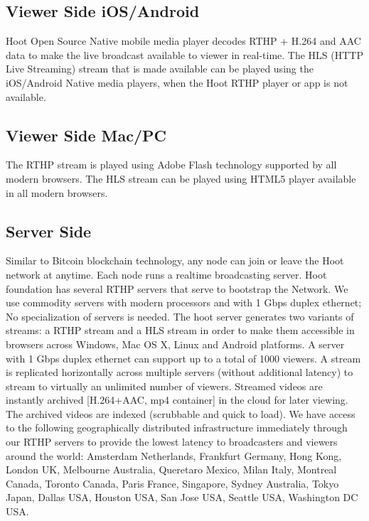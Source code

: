 \subsection{Viewer Side iOS/Android }
 Hoot Open Source Native mobile media player decodes RTHP + H.264 and AAC data to make the live broadcast available to viewer in real-time. The HLS (HTTP Live Streaming) stream that is made available can be played using the iOS/Android Native media players, when the Hoot RTHP player or app is not available.

\subsection{Viewer Side Mac/PC} 
The RTHP stream is played using Adobe Flash technology supported by all modern browsers. The HLS stream can be played using HTML5 player available in all modern browsers.

\subsection{Server Side}
Similar to Bitcoin blockchain technology, any node can join or leave the Hoot network at anytime. Each node runs a realtime broadcasting server.
Hoot foundation has several RTHP servers that serve to bootstrap the Network. We use commodity servers with modern processors and with 1 Gbps duplex ethernet;
No specialization of servers is needed. The hoot server generates two variants of streams: a RTHP stream and a HLS stream in order to make them accessible in browsers across Windows, Mac OS X, Linux and Android platforms. A server with 1 Gbps duplex ethernet can support up to a total of 1000 viewers. A stream is replicated horizontally across multiple servers (without additional latency) to stream to virtually an unlimited number of viewers. 
Streamed videos are instantly archived [H.264+AAC, mp4 container] in the cloud for later viewing. The archived videos are indexed (scrubbable and quick to load). We have access to the following geographically distributed infrastructure immediately through our RTHP servers to provide the lowest latency to broadcasters and viewers around the world: Amsterdam Netherlands, Frankfurt Germany, Hong Kong, London UK, Melbourne Australia, Queretaro Mexico, Milan Italy, Montreal Canada, Toronto Canada, Paris France, Singapore, Sydney Australia, Tokyo Japan, Dallas USA, Houston USA, San Jose USA, Seattle USA, Washington DC USA.

